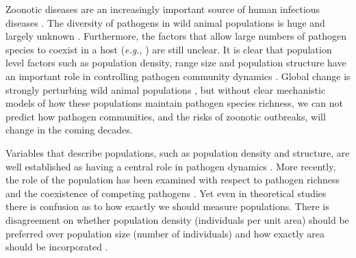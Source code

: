 Zoonotic diseases are an increasingly important source of human infectious diseases \cite{jones2008global, woolhouse2006host, taylor2001risk}.
The diversity of pathogens in wild animal populations is huge and largely unknown \cite{poulin2014parasite}.
Furthermore, the factors that allow large numbers of pathogen species to coexist in a host (\emph{e.g.}, \textcite{anthony2013strategy}) are still unclear.
It is clear that population level factors such as population density, range size and population structure have an important role in controlling pathogen community dynamics \cite{anderson1979population, may1979population, colizza2007invasion, may2001infection}.
Global change is strongly perturbing wild animal populations \cite{thomas2004extinction, craigie2010large}, but without clear mechanistic models of how these populations maintain pathogen species richness, we can not predict how pathogen communities, and the risks of zoonotic outbreaks, will change in the coming decades.






Variables that describe populations, such as population density and structure, are well established as having a central role in pathogen dynamics \cite{colizza2007invasion, barthelemy2010fluctuation, colizza2007invasion,  wu2013threshold, may1979population, anderson1979population}.
More recently, the role of the population has been examined with respect to pathogen richness and the coexistence of competing pathogens \cite{qiu2013vector, allen2004sis, nunes2006localized}.
Yet even in theoretical studies there is confusion as to how exactly we should measure populations.
There is disagreement on whether population density (individuals per unit area) should be preferred over population size (number of individuals) and how exactly area should be incorporated \cite{begon2002clarification}. 


